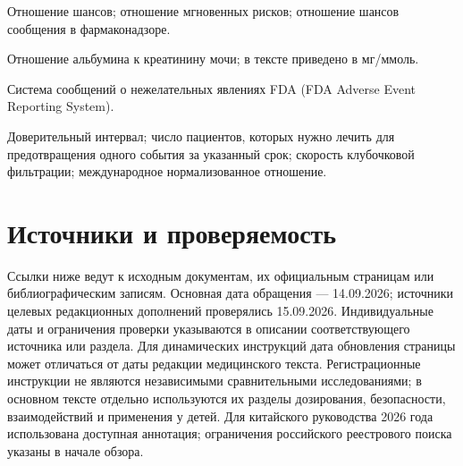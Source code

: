 \documentclass[11pt,a4paper,notitlepage]{report}
\begin{document}
\begin{description}[style=nextline]
\item[OR; HR; ROR] Отношение шансов; отношение мгновенных рисков; отношение шансов сообщения в фармаконадзоре.
\item[ACR] Отношение альбумина к креатинину мочи; в тексте приведено в мг/ммоль.
\item[FAERS] Система сообщений о нежелательных явлениях FDA (FDA Adverse Event Reporting System).
\item[ДИ; NNT; СКФ; МНО] Доверительный интервал; число пациентов, которых нужно лечить для предотвращения одного события за указанный срок; скорость клубочковой фильтрации; международное нормализованное отношение.
\end{description}

\section*{Источники и проверяемость}
Ссылки ниже ведут к исходным документам, их официальным страницам или библиографическим записям. Основная дата обращения --- 14.09.2026; источники целевых редакционных дополнений проверялись 15.09.2026. Индивидуальные даты и ограничения проверки указываются в описании соответствующего источника или раздела. Для динамических инструкций дата обновления страницы может отличаться от даты редакции медицинского текста. Регистрационные инструкции не являются независимыми сравнительными исследованиями; в основном тексте отдельно используются их разделы дозирования, безопасности, взаимодействий и применения у детей. Для китайского руководства 2026 года использована доступная аннотация; ограничения российского реестрового поиска указаны в начале обзора.
\end{document}
